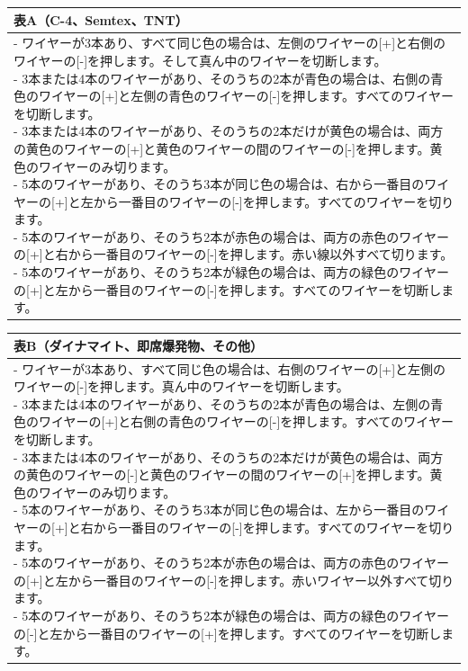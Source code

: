 \bgroup
\def\arraystretch{1.3}
\begin{tabular}{|l|}\hline
表{A}（{C-4}、{Semtex}、{TNT}）\\\hline
\parbox{\textwidth}{
\vspace*{0.3em}
- ワイヤーが3本あり、すべて同じ色の場合は、左側のワイヤーの[+]と右側のワイヤーの[-]を押します。そして真ん中のワイヤーを切断します。\\[0.5em]
- 3本または4本のワイヤーがあり、そのうちの2本が青色の場合は、右側の青色のワイヤーの[+]と左側の青色のワイヤーの[-]を押します。すべてのワイヤーを切断します。\\[0.5em]
- 3本または4本のワイヤーがあり、そのうちの2本だけが黄色の場合は、両方の黄色のワイヤーの[+]と黄色のワイヤーの間のワイヤーの[-]を押します。黄色のワイヤーのみ切ります。\\[0.5em]
- 5本のワイヤーがあり、そのうち3本が同じ色の場合は、右から一番目のワイヤーの[+]と左から一番目のワイヤーの[-]を押します。すべてのワイヤーを切ります。\\[0.5em]
- 5本のワイヤーがあり、そのうち2本が赤色の場合は、両方の赤色のワイヤーの[+]と右から一番目のワイヤーの[-]を押します。赤い線以外すべて切ります。\\[0.5em]
- 5本のワイヤーがあり、そのうち2本が緑色の場合は、両方の緑色のワイヤーの[+]と左から一番目のワイヤーの[-]を押します。すべてのワイヤーを切断します。
\vspace*{0.3em}
}\\\hline
\end{tabular}
\egroup

\bgroup
\def\arraystretch{1.3}
\begin{tabular}{|l|}\hline
表{B}（ダイナマイト、即席爆発物、その他）\\\hline
\parbox{\textwidth}{
\vspace*{0.3em}
- ワイヤーが3本あり、すべて同じ色の場合は、右側のワイヤーの[+]と左側のワイヤーの[-]を押します。真ん中のワイヤーを切断します。\\[0.5em]
- 3本または4本のワイヤーがあり、そのうちの2本が青色の場合は、左側の青色のワイヤーの[+]と右側の青色のワイヤーの[-]を押します。すべてのワイヤーを切断します。\\[0.5em]
- 3本または4本のワイヤーがあり、そのうちの2本だけが黄色の場合は、両方の黄色のワイヤーの[-]と黄色のワイヤーの間のワイヤーの[+]を押します。黄色のワイヤーのみ切ります。\\[0.5em]
- 5本のワイヤーがあり、そのうち3本が同じ色の場合は、左から一番目のワイヤーの[+]と右から一番目のワイヤーの[-]を押します。すべてのワイヤーを切ります。\\[0.5em]
- 5本のワイヤーがあり、そのうち2本が赤色の場合は、両方の赤色のワイヤーの[+]と左から一番目のワイヤーの[-]を押します。赤いワイヤー以外すべて切ります。\\[0.5em]
- 5本のワイヤーがあり、そのうち2本が緑色の場合は、両方の緑色のワイヤーの[-]と左から一番目のワイヤーの[+]を押します。すべてのワイヤーを切断します。
\vspace*{0.3em}
}\\\hline
\end{tabular}
\egroup

